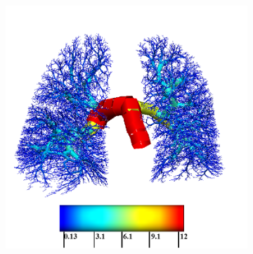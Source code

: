 \begin{figure}[htbp] 
\centering
\begin{subfigure}{.5\linewidth}%
  \includegraphics[width=\linewidth,trim={{.0\wd0} {.0\wd0} {.0\wd0} {.0\wd0}},clip]{ModelBasedAnalysis/Image/IPF405_ArteryRadius_IPF.png}

\end{subfigure}
\end{figure}
